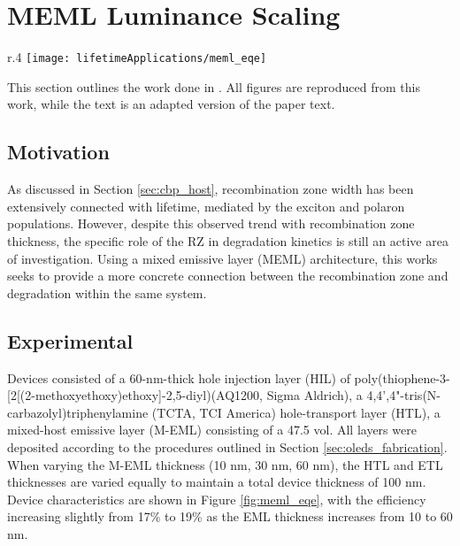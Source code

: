 \documentclass[../thesis.tex]{subfiles}
\begin{document}
\newpage
\section{MEML Luminance Scaling}\label{sec:lifetime_meml}

\begin{wrapfigure}{r}{.4\textwidth}
\centering
\texttt{[image: lifetimeApplications/meml\_eqe]}
\caption{a. Current Density and b. Luminance as a function of Voltage.  c. \eqe for all three EML thicknesses.  Inset is MEML device architecture.}
\label{fig:meml_eqe}
\end{wrapfigure}

This section outlines the work done in \textcite{Bangsund2018a}.  
All figures are reproduced from this work, while the text is an adapted version of the paper text.

\subsection{Motivation}

As discussed in Section \ref{sec:cbp_host}, recombination zone width has been extensively connected with lifetime, mediated by the exciton and polaron populations.\supercite{Scholz2015,Giebink2008a,Giebink2009a,So2010,Zhang2016,Schmidbauer2013,Wu2016,Lee2006,Chwang2002}
However, despite this observed trend with recombination zone thickness, the specific role of the RZ in degradation kinetics is still an active area of investigation.
Using a mixed emissive layer (MEML) architecture, this works seeks to provide a more concrete connection between the recombination zone and degradation within the same system.  

\subsection{Experimental}


Devices consisted of a 60-nm-thick hole injection layer (HIL) of poly(thiophene-3-[2[(2-methoxyethoxy)ethoxy]-2,5-diyl)(AQ1200, Sigma Aldrich), a 4,4',4"-tris(N-carbazolyl)triphenylamine (TCTA, TCI America) hole-transport layer (HTL), a mixed-host emissive layer (M-EML) consisting of a 47.5 vol.%
All layers were deposited according to the procedures outlined in Section \ref{sec:oleds_fabrication}.
When varying the M-EML thickness (10 nm, 30 nm, 60 nm), the HTL and ETL thicknesses are varied equally to maintain a total device thickness of 100 nm.
Device characteristics are shown in Figure \ref{fig:meml_eqe}, with the efficiency increasing slightly from 17\% to 19\% as the EML thickness increases from 10 to 60 nm.
\end{document}
